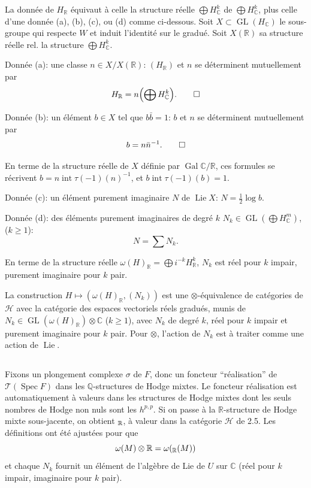 \documentclass[12pt,a4paper]{article}
\theoremstyle{plain}
\theoremstyle{definition}
\theoremstyle{remark}
\DeclareMathOperator{\Spec}{Spec}
\DeclareMathOperator{\Lie}{Lie}
\DeclareMathOperator{\intt}{int}
\newcommand{\Q}{\mathbb{Q}}
\newcommand{\R}{\mathbb{R}}
\newcommand{\C}{\mathbb{C}}
\begin{document}
La donn{\'e}e de $H_\R$ {\'e}quivaut {\`a} celle la structure r{\'e}elle $\bigoplus H_\C^k$ de $\bigoplus H_\C^k$, plus celle d'une donn{\'e}e (a), (b), (c), ou (d) comme ci-dessous. Soit $X\subset\operatorname{GL}(H_\C)$ le sous-groupe qui respecte $W$ et induit l'identit{\'e} sur le gradu{\'e}. Soit $X(\R)$ sa structure r{\'e}elle rel. la structure $\bigoplus H_\C^k$.

Donn{\'e}e (a): une classe $n\in X/X(\R)$: $(H_\R)$ et $n$ se d{\'e}terminent mutuellement par
\begin{equation*}
H_\R = n\Bigl(\bigoplus H_\C^k\Bigr).\qedhere
\end{equation*}

Donn{\'e}e (b): un {\'e}l{\'e}ment $b\in X$ tel que $b\bar{b}=1$: $b$ et $n$ se d{\'e}terminent mutuellement par
\begin{equation*}
b = n\bar{n}^{-1}.\qedhere
\end{equation*}

En terme de la structure r{\'e}elle de $X$ d{\'e}finie par $\operatorname{Gal}\C/\R$, ces formules se r{\'e}crivent $b=n\intt\tau(-1)(n)^{-1}$, et $b\intt\tau(-1)(b)=1$.

Donn{\'e}e (c): un {\'e}l{\'e}ment purement imaginaire $N$ de $\Lie X$: $N=\frac{1}{2}\log b$.

Donn{\'e}e (d): des {\'e}l{\'e}ments purement imaginaires de degr{\'e} $k$ $N_k\in\operatorname{GL}(\bigoplus H_\C^m)$, ($k\geq 1$):
\begin{equation*}
N = \sum N_k.
\end{equation*}

En terme de la structure r{\'e}elle $\omega(H)_\R=\bigoplus i^{-k}H_\R^k$, $N_k$ est r{\'e}el pour $k$ impair, purement imaginaire pour $k$ pair.

La construction $H\mapsto(\omega(H)_\R,(N_k))$ est une $\otimes$-{\'e}quivalence de cat{\'e}gories de $\mathscr{H}$ avec la cat{\'e}gorie des espaces vectoriels r{\'e}els gradu{\'e}s, munis de $N_k\in\operatorname{GL}(\omega(H)_\R)\otimes\C$ ($k\geq 1$), avec $N_k$ de degr{\'e} $k$, r{\'e}el pour $k$ impair et purement imaginaire pour $k$ pair. Pour $\otimes$, l'action de $N_k$ est {\`a} traiter comme une action de $\Lie$.

\subsection{}

Fixons un plongement complexe $\sigma$ de $F$, donc un foncteur ``r{\'e}alisation'' de $\mathcal{T}(\Spec F)$ dans les $\Q$-structures de Hodge mixtes. Le foncteur r{\'e}alisation est automatiquement {\`a} valeurs dans les structures de Hodge mixtes dont les seuls nombres de Hodge non nuls sont les $h^{p,p}$. Si on passe {\`a} la $\R$-structure de Hodge mixte sous-jacente, on obtient $\real_\R$, {\`a} valeur dans la cat{\'e}gorie $\mathscr{H}$ de 2.5. Les d{\'e}finitions ont {\'e}t{\'e} ajust{\'e}es pour que
\begin{equation*}
\omega(M)\otimes\R = \omega(\real_\R(M))
\end{equation*}
et chaque $N_k$ fournit un {\'e}l{\'e}ment de l'alg{\`e}bre de Lie de $U$ sur $\C$ (r{\'e}el pour $k$ impair, imaginaire pour $k$ pair).
\end{document}
